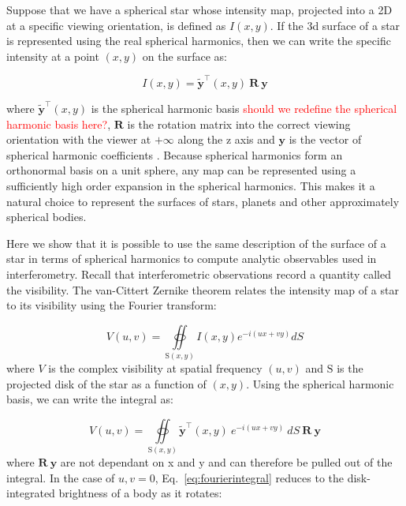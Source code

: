 \documentclass[modern]{aastex631}
\begin{document}
Suppose that we have a spherical star whose intensity map, projected into a 2D at a specific viewing orientation, is defined as $I(x,y)$. If the 3d surface of a star is represented using the real spherical harmonics, then we can write the specific intensity at a point $(x,y)$ on the surface as:

\begin{equation}
    I(x,y) = \mathbf{\tilde{y}}^\top(x,y) \ \mathbf{R} \ \mathbf{y}
\end{equation}

where $\mathbf{\tilde{y}}^\top(x,y)$ is the spherical harmonic basis \textcolor{red}{should we redefine the spherical harmonic basis here?}, $\mathbf{R}$ is the rotation matrix into the correct viewing orientation with the viewer at $+\infty$ along the z axis and $\mathbf{y}$ is the vector of spherical harmonic coefficients \citep{starry2019}. Because spherical harmonics form an orthonormal basis on a unit sphere, any map can be represented using a sufficiently high order expansion in the spherical harmonics. This makes it a natural choice to represent the surfaces of stars, planets and other approximately spherical bodies.

Here we show that it is possible to use the same description of the surface of a star in terms of spherical harmonics to compute analytic observables used in interferometry. Recall that interferometric observations record a quantity called the visibility. The van-Cittert Zernike theorem relates the intensity map of a star to its visibility using the Fourier transform:

\begin{equation} \label{eq:vcztheorem}
V(u,v) = \oiint\limits_{\mathrm{S}(x,y)} I(x,y) e^{-i(ux + vy)} dS
\end{equation}
where $V$ is the complex visibility at spatial frequency $(u,v)$ and $\mathrm{S}$ is the projected disk of the star as a function of $(x,y)$. Using the spherical harmonic basis, we can write the integral as:

\begin{equation} \label{eq:fourierintegral}
   V(u,v) = \oiint\limits_{\mathrm{S}(x,y)} \mathbf{\tilde{y}}^\top(x,y) \ e^{-i(ux + vy)} \ dS \ \mathbf{R} \ \mathbf{y}
\end{equation} 
where $\mathbf{R} \ \mathbf{y}$ are not dependant on x and y and can therefore be pulled out of the integral. In the case of $u, v = 0$, Eq.~\ref{eq:fourierintegral} reduces to the disk-integrated brightness of a body as it rotates:
\end{document}
